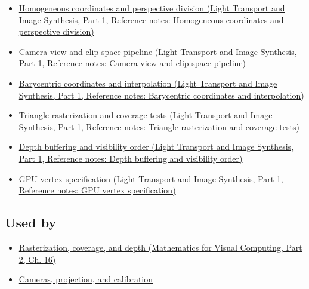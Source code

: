 \hypertarget{appendix-40426e4b2103-prerequisites}{}

\begin{itemize}
\tightlist
\item
  \href{../04-Light-Transport-and-Image-Synthesis-P01/main.pdf\#appendix-cb3b26862282}{Homogeneous coordinates and perspective division (Light Transport and Image Synthesis, Part 1, Reference notes: Homogeneous coordinates and perspective division)}
\item
  \href{../04-Light-Transport-and-Image-Synthesis-P01/main.pdf\#appendix-1c07d64f5e70}{Camera view and clip-space pipeline (Light Transport and Image Synthesis, Part 1, Reference notes: Camera view and clip-space pipeline)}
\item
  \href{../04-Light-Transport-and-Image-Synthesis-P01/main.pdf\#appendix-02b9d9a81dca}{Barycentric coordinates and interpolation (Light Transport and Image Synthesis, Part 1, Reference notes: Barycentric coordinates and interpolation)}
\item
  \href{../04-Light-Transport-and-Image-Synthesis-P01/main.pdf\#appendix-ed3f9bc298fe}{Triangle rasterization and coverage tests (Light Transport and Image Synthesis, Part 1, Reference notes: Triangle rasterization and coverage tests)}
\item
  \href{../04-Light-Transport-and-Image-Synthesis-P01/main.pdf\#appendix-97578ed97952}{Depth buffering and visibility order (Light Transport and Image Synthesis, Part 1, Reference notes: Depth buffering and visibility order)}
\item
  \href{../04-Light-Transport-and-Image-Synthesis-P01/main.pdf\#appendix-749ba51a6c25}{GPU vertex specification (Light Transport and Image Synthesis, Part 1, Reference notes: GPU vertex specification)}
\end{itemize}

\subsection{Used by}\label{appendix-40426e4b2103-used-by}

\hypertarget{appendix-40426e4b2103-used-by}{}

\begin{itemize}
\tightlist
\item
  \href{../02-Mathematics-for-Visual-Computing-P02/main.pdf\#03-visual-computing-i-ch012-rasterization-coverage-and-depth}{Rasterization, coverage, and depth (Mathematics for Visual Computing, Part 2, Ch. 16)}
\item
  \hyperref[03-visual-computing-i-ch003-cameras-projection-and-calibration]{Cameras, projection, and calibration}
\end{itemize}

